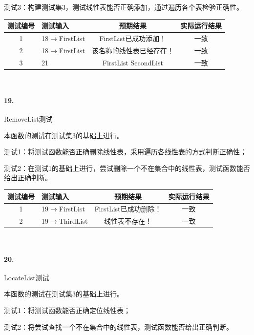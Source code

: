 \documentclass[supercite]{Experimental_Report}
\theoremstyle{definition}
\begin{document}
测试3：构建测试集3，测试线性表能否正确添加，通过遍历各个表检验正确性。

\vspace{0.5em}

\begin{tabular}{|c|p{2.7cm}|c|c|}
	\hline
	测试编号 & 测试输入 & 预期结果 & 实际运行结果 \\
	\hline
	1 & 18$\rightarrow$FirstList & FirstList已成功添加！ & 一致 \\
	\hline
	2 & 18$\rightarrow$FirstList & 该名称的线性表已经存在！ & 一致 \\
	\hline
	3 & 21 & FirstList SecondList & 一致 \\
	\hline
\end{tabular}

~\

\paragraph{19.}RemoveList测试

本函数的测试在测试集3的基础上进行。

测试1：将测试函数能否正确删除线性表，采用遍历各线性表的方式判断正确性；

测试2：在测试1的基础上进行，尝试删除一个不在集合中的线性表，测试函数能否给出正确判断。

\vspace{0.5em}

\begin{tabular}{|c|p{2.7cm}|c|c|}
	\hline
	测试编号 & 测试输入 & 预期结果 & 实际运行结果 \\
	\hline
	1 & 19$\rightarrow$FirstList & FirstList已成功删除！ & 一致 \\
	\hline
	2 & 19$\rightarrow$ThirdList & 线性表不存在！ & 一致 \\
	\hline
\end{tabular}

~\

\paragraph{20.}LocateList测试
	
本函数的测试在测试集3的基础上进行。

测试1：将测试函数能否正确定位线性表；

测试2：将尝试查找一个不在集合中的线性表，测试函数能否给出正确判断。

\vspace{0.5em}
\end{document}
